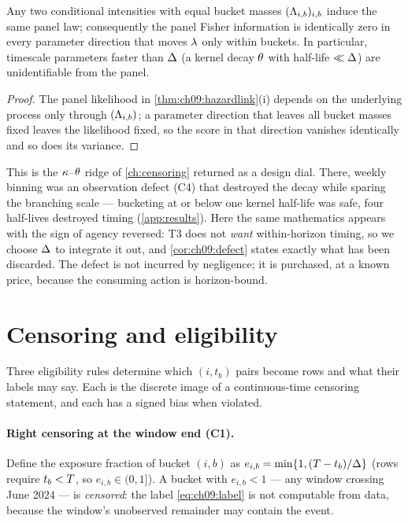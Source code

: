 \begin{corollary}\label{cor:ch09:defect}
Any two conditional intensities with equal bucket masses
$(\Lambda_{i,b})_{i,b}$ induce the same panel law; consequently the panel
Fisher information is identically zero in every parameter direction that
moves $\lambda$ only within buckets. In particular, timescale parameters
faster than $\Delta$ (a kernel decay $\theta$ with half-life
$\ll \Delta$) are unidentifiable from the panel.
\end{corollary}

\begin{proof}
The panel likelihood in \cref{thm:ch09:hazardlink}(i) depends on the
underlying process only through $(\Lambda_{i,b})$; a parameter direction
that leaves all bucket masses fixed leaves the likelihood fixed, so the
score in that direction vanishes identically and so does its variance.
\end{proof}

This is the $\kappa$--$\theta$ ridge of \cref{ch:censoring} returned as
a design dial. There, weekly binning was an observation defect (C4) that
destroyed the decay while sparing the branching scale --- bucketing at or
below one kernel half-life was safe, four half-lives destroyed timing
(\cref{app:results}). Here the same mathematics appears with the sign of
agency reversed: T3 does not \emph{want} within-horizon timing, so we
choose $\Delta$ to integrate it out, and \cref{cor:ch09:defect} states
exactly what has been discarded. The defect is not incurred by
negligence; it is purchased, at a known price, because the consuming
action is horizon-bound.

\section{Censoring and eligibility}\label{ch09:sec:censoring}

Three eligibility rules determine which $(i, t_b)$ pairs become rows and
what their labels may say. Each is the discrete image of a
continuous-time censoring statement, and each has a signed bias when
violated.

\paragraph{Right censoring at the window end (C1).} Define the exposure
fraction of bucket $(i,b)$ as
$e_{i,b} = \min\{1, (T - t_b)/\Delta\}$ (rows require
$t_b < T$, so $e_{i,b} \in (0,1]$). A bucket with $e_{i,b} < 1$ ---
any window crossing June 2024 --- is \emph{censored}: the label
\cref{eq:ch09:label} is not computable from data, because the window's
unobserved remainder may contain the event.

